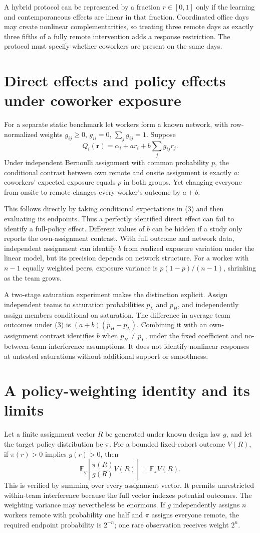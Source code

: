 \documentclass[11pt,a4paper]{article}
\newcommand{\E}{\mathbb E}
\begin{document}
A hybrid protocol can be represented by a fraction $r\in[0,1]$ only if the learning and contemporaneous effects are linear in that fraction. Coordinated office days may create nonlinear complementarities, so treating three remote days as exactly three fifths of a fully remote intervention adds a response restriction. The protocol must specify whether coworkers are present on the same days.

\section{Direct effects and policy effects under coworker exposure}
For a separate static benchmark let workers form a known network, with row-normalized weights $g_{ij}\ge0$, $g_{ii}=0$, $\sum_jg_{ij}=1$. Suppose
\[
 Q_i(\mathbf r)=\alpha_i+a r_i+b\sum_jg_{ij}r_j. \tag{3}
\]
Under independent Bernoulli assignment with common probability $p$, the conditional contrast between own remote and onsite assignment is exactly $a$: coworkers' expected exposure equals $p$ in both groups. Yet changing everyone from onsite to remote changes every worker's outcome by $a+b$.

This follows directly by taking conditional expectations in (3) and then evaluating its endpoints. Thus a perfectly identified direct effect can fail to identify a full-policy effect. Different values of $b$ can be hidden if a study only reports the own-assignment contrast. With full outcome and network data, independent assignment can identify $b$ from realized exposure variation under the linear model, but its precision depends on network structure. For a worker with $n-1$ equally weighted peers, exposure variance is $p(1-p)/(n-1)$, shrinking as the team grows.

A two-stage saturation experiment makes the distinction explicit. Assign independent teams to saturation probabilities $p_L$ and $p_H$, and independently assign members conditional on saturation. The difference in average team outcomes under (3) is $(a+b)(p_H-p_L)$. Combining it with an own-assignment contrast identifies $b$ when $p_H\ne p_L$, under the fixed coefficient and no-between-team-interference assumptions. It does not identify nonlinear responses at untested saturations without additional support or smoothness.

\section{A policy-weighting identity and its limits}
Let a finite assignment vector $R$ be generated under known design law $g$, and let the target policy distribution be $\pi$. For a bounded fixed-cohort outcome $V(R)$, if $\pi(r)>0$ implies $g(r)>0$, then
\[
 \E_g\left[\frac{\pi(R)}{g(R)}V(R)\right]=\E_\pi V(R). \tag{4}
\]
This is verified by summing over every assignment vector. It permits unrestricted within-team interference because the full vector indexes potential outcomes. The weighting variance may nevertheless be enormous. If $g$ independently assigns $n$ workers remote with probability one half and $\pi$ assigns everyone remote, the required endpoint probability is $2^{-n}$; one rare observation receives weight $2^n$.
\end{document}
